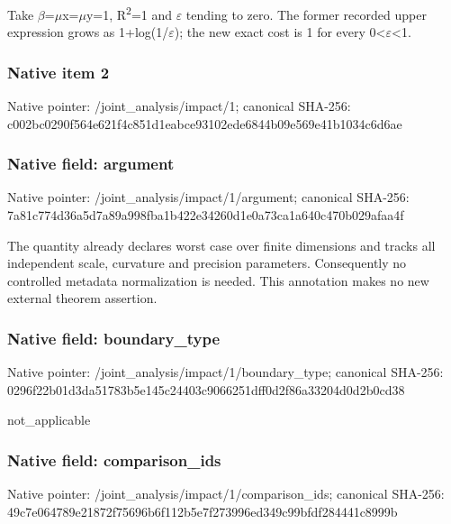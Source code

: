 \documentclass[10pt,a4paper]{article}
\begin{document}
Take \ensuremath{\beta}=\ensuremath{\mu}x=\ensuremath{\mu}y=1, R\textsuperscript{2}=1 and \ensuremath{\varepsilon} tending to zero. The former recorded upper expression grows as 1+log(1/\ensuremath{\varepsilon}); the new exact cost is 1 for every 0<\ensuremath{\varepsilon}<1.


\subsubsection{Native item 2}


Native pointer: /joint\_analysis/impact/1; canonical SHA-256: c002bc0290f564e621f4c851\allowbreak{}d1eabce93102ede6844b09e5\allowbreak{}69e41b1034c6d6ae



\subsubsection{Native field: argument}


Native pointer: /joint\_analysis/impact/1/argument; canonical SHA-256: 7a81c774d36a5d7a89a998fb\allowbreak{}a1b422e34260d1e0a73ca1a6\allowbreak{}40c470b029afaa4f


The quantity already declares worst case over finite dimensions and tracks all independent scale, curvature and precision parameters. Consequently no controlled metadata normalization is needed. This annotation makes no new external theorem assertion.


\subsubsection{Native field: boundary\_type}


Native pointer: /joint\_analysis/impact/1/boundary\_type; canonical SHA-256: 0296f22b01d3da51783b5e14\allowbreak{}5c24403c9066251dff0d2f86\allowbreak{}a33204d0d2b0cd38


not\_applicable


\subsubsection{Native field: comparison\_ids}


Native pointer: /joint\_analysis/impact/1/comparison\_ids; canonical SHA-256: 49c7e064789e21872f75696b\allowbreak{}6f112b5e7f273996ed349c99\allowbreak{}bfdf284441c8999b
\end{document}
